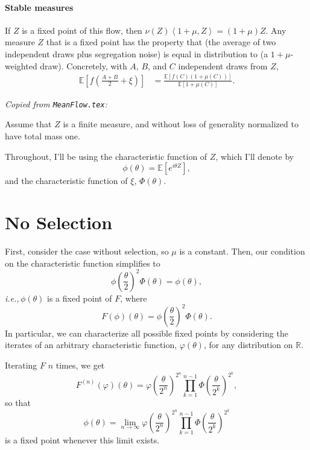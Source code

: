 \documentclass{article}
\newcommand{\E}{\mathbb{E}}
\newcommand{\ip}[2]{\left\langle #1, #2 \right\rangle}
\newcommand{\ie}{\textit{i.e.,}\,}
\newcommand{\comment}[1]{{\color{blue} \it #1}}
\theoremstyle{remark}
\theoremstyle{definition}
\begin{document}
\paragraph{Stable measures}
If $Z$ is a fixed point of this flow,
then $\nu(Z)\ip{1+\mu}{Z} = (1+\mu)Z$.
Any measure $Z$ that is a fixed point has the property that
(the average of two independent draws plus segregation noise)
is equal in distribution to
(a $1+\mu$-weighted draw).
Concretely, with $A$, $B$, and $C$ independent draws from $Z$,
$$\begin{aligned}
    \E\left[ f\left( \frac{A+B}{2} + \xi \right) \right]
    &=
    \frac{\E\left[ f(C) (1+\mu(C)) \right]}{\E[1+\mu(C)]} .
\end{aligned}$$

\comment{Copied from \texttt{MeanFlow.tex}:}

Assume that $Z$ is a finite measure, and without loss of generality normalized to have total mass one.

Throughout, I'll be using the characteristic function of $Z$, which I'll denote by 
\[
	\phi(\theta) = \mathbb{E}\left[e^{i\theta Z}\right],
\]
and the characteristic function of $\xi$, $\Phi(\theta)$.

\section{No Selection}

First, consider the case without selection, so $\mu$ is a constant.  Then, our condition on the characteristic function simplifies to
\begin{equation}\label{CHARACTERISTIC}
	{\textstyle \phi\left(\frac{\theta}{2}\right)^{2}} \Phi(\theta) %
	= \phi(\theta),
\end{equation}
\ie $\phi(\theta)$ is a fixed point of $F$, where
 \[
	F(\phi)(\theta) = {\textstyle \phi\left(\frac{\theta}{2}\right)^{2}} \Phi(\theta).
\]
In particular, we can characterize all possible fixed points by considering the iterates of an arbitrary characteristic function, $\varphi(\theta)$, for  any distribution on $\mathbb{R}$.  

Iterating $F$ $n$ times, we get
\[
	F^{(n)}(\varphi)(\theta)
	=  {\textstyle \varphi\left(\frac{\theta}{2^{n}}\right)^{2^{n}}}\prod_{k=1}^{n-1} {\textstyle \Phi\left(\frac{\theta}{2^{k}}\right)^{2^{k}}},
\]
so that
\[
	\phi(\theta) = \lim_{n \to \infty} \varphi\left(\frac{\theta}{2^{n}}\right)^{2^{n}}\prod_{k=1}^{n-1}\Phi\left(\frac{\theta}{2^{k}}\right)^{2^{k}}
\]
is a fixed point whenever this limit exists.  
\end{document}
